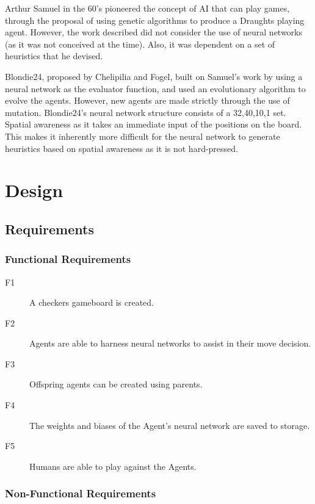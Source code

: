 \documentclass[12pt,a4paper]{article}
\begin{document}
    Arthur Samuel in the 60's pioneered the concept of AI that can play games, through the proposal of using genetic algorithms to produce a Draughts playing agent. However, the work described did not consider the use of neural networks (as it was not conceived at the time). Also, it was dependent on a set of heuristics that he devised. 

    Blondie24, proposed by Chelipilia and Fogel, built on Samuel's work by using a neural network as the evaluator function, and used an evolutionary algorithm to evolve the agents. However, new agents are made strictly through the use of mutation. Blondie24's neural network structure consists of a {32,40,10,1} set. Spatial awareness as it takes an immediate input of the positions on the board. This makes it inherently more difficult for the neural network to generate heuristics based on spatial awareness as it is not hard-pressed.


\section{Design}

\subsection*{Requirements}

    \subsubsection*{Functional Requirements}

    \begin{description}
        \item [F1] A checkers gameboard is created.
        \item [F2] Agents are able to harness neural networks to assist in their move decision.
        \item [F3] Offspring agents can be created using parents.
        \item [F4] The weights and biases of the Agent's neural network are saved to storage.
        \item [F5] Humans are able to play against the Agents.
        
    \end{description}

    \subsubsection*{Non-Functional Requirements}
\end{document}
